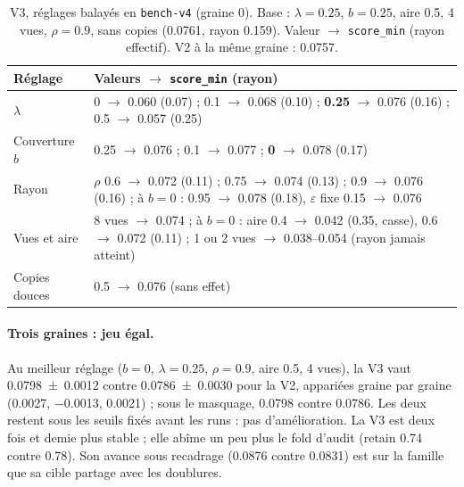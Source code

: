 \documentclass[11pt,a4paper]{article}
\newcommand{\code}[1]{\texttt{#1}}
\begin{document}
\begin{table}[ht]
  \centering\small
  \caption{V3, réglages balayés en \code{bench-v4} (graine 0). Base : $\lambda=\num{0.25}$,
  $b=\num{0.25}$, aire \num{0.5}, 4 vues, $\rho=\num{0.9}$, sans copies (\num{0.0761}, rayon
  \num{0.159}). Valeur $\to$ \code{score\_min} (rayon effectif). V2 à la même graine :
  \num{0.0757}.}\label{tab:v3reglages}
  \begin{tabularx}{\linewidth}{@{}>{\raggedright}p{3.2cm}X@{}}
    \toprule
    Réglage & Valeurs $\to$ \code{score\_min} (rayon)\\
    \midrule
    $\lambda$ & 0 $\to$ \num{0.060} (\num{0.07}) ; \num{0.1} $\to$ \num{0.068} (\num{0.10}) ;
      \textbf{\num{0.25}} $\to$ \num{0.076} (\num{0.16}) ; \num{0.5} $\to$ \num{0.057} (\num{0.25})\\
    Couverture $b$ & \num{0.25} $\to$ \num{0.076} ; \num{0.1} $\to$ \num{0.077} ;
      \textbf{0} $\to$ \num{0.078} (\num{0.17})\\
    Rayon & $\rho$ \num{0.6} $\to$ \num{0.072} (\num{0.11}) ; \num{0.75} $\to$ \num{0.074} (\num{0.13}) ;
      \num{0.9} $\to$ \num{0.076} (\num{0.16}) ; à $b=0$ : \num{0.95} $\to$ \num{0.078} (\num{0.18}),
      $\varepsilon$ fixe \num{0.15} $\to$ \num{0.076}\\
    Vues et aire & 8 vues $\to$ \num{0.074} ; à $b=0$ : aire \num{0.4} $\to$ \num{0.042} (\num{0.35},
      casse), \num{0.6} $\to$ \num{0.072} (\num{0.11}) ; 1 ou 2 vues $\to$ \numrange{0.038}{0.054}
      (rayon jamais atteint)\\
    Copies douces & \num{0.5} $\to$ \num{0.076} (sans effet)\\
    \bottomrule
  \end{tabularx}
\end{table}

\paragraph{Trois graines : jeu égal.} Au meilleur réglage ($b=0$, $\lambda=\num{0.25}$,
$\rho=\num{0.9}$, aire \num{0.5}, 4 vues), la V3 vaut \num{0.0798 +- 0.0012} contre
\num{0.0786 +- 0.0030} pour la V2, appariées graine par graine (\num{+0.0027}, \num{-0.0013},
\num{+0.0021}) ; sous le masquage, \num{0.0798} contre \num{0.0786}. Les deux restent sous les seuils
fixés avant les runs : pas d'amélioration. La V3 est deux fois et demie plus stable ; elle abîme un
peu plus le fold d'audit (retain \num{0.74} contre \num{0.78}). Son avance sous recadrage
(\num{0.0876} contre \num{0.0831}) est sur la famille que sa cible partage avec les doublures.
\end{document}
